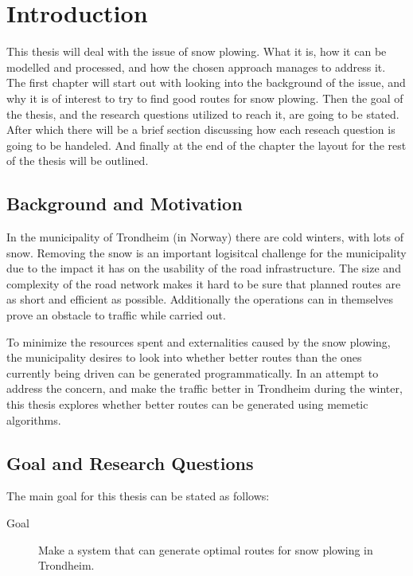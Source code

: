 \chapter{Introduction}

This thesis will deal with the issue of snow plowing. What it is, how it can be modelled and processed, and how the chosen approach manages to address it. The first chapter will start out with looking into the background of the issue, and why it is of interest to try to find good routes for snow plowing. Then the goal of the thesis, and the research questions utilized to reach it, are going to be stated. After which there will be a brief section discussing how each reseach question is going to be handeled. And finally at the end of the chapter the layout for the rest of the thesis will be outlined.

\section{Background and Motivation}

In the municipality of Trondheim (in Norway) there are cold winters, with lots of snow. Removing the snow is an important logisitcal challenge for the municipality due to the impact it has on the usability of the road infrastructure. The size and complexity of the road network makes it hard to be sure that planned routes are as short and efficient as possible. Additionally the operations can in themselves prove an obstacle to traffic while carried out.

To minimize the resources spent and externalities caused by the snow plowing, the municipality desires to look into whether better routes than the ones currently being driven can be generated programmatically. In an attempt to address the concern, and make the traffic better in Trondheim during the winter, this thesis explores whether better routes can be generated using memetic algorithms.

\section{Goal and Research Questions}

The main goal for this thesis can be stated as follows:

\begin{description}
	\item [Goal] Make a system that can generate optimal routes for snow plowing in Trondheim.
\end{description}

